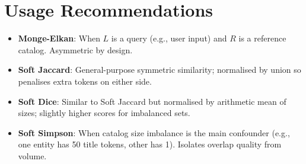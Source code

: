 \section{Usage Recommendations}

\begin{itemize}
	\item \textbf{Monge-Elkan}: When $L$ is a query (e.g., user input) and $R$ is a reference catalog. Asymmetric by design.
	\item \textbf{Soft Jaccard}: General-purpose symmetric similarity; normalised by union so penalises extra tokens on either side.
	\item \textbf{Soft Dice}: Similar to Soft Jaccard but normalised by arithmetic mean of sizes; slightly higher scores for imbalanced sets.
	\item \textbf{Soft Simpson}: When catalog size imbalance is the main confounder (e.g., one entity has 50 title tokens, other has 1). Isolates overlap quality from volume.
\end{itemize}